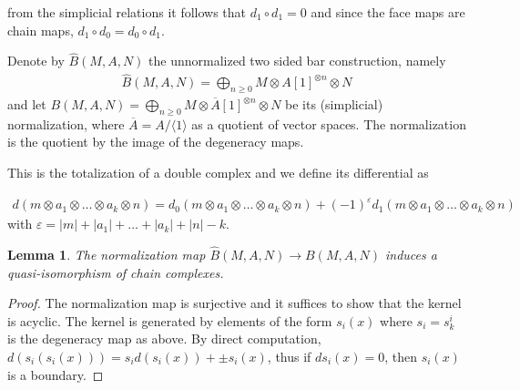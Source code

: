 \documentclass{scrartcl}
\theoremstyle{plain}
\newtheorem{lemma}[theorem]{Lemma}
\theoremstyle{definition}
\renewcommand{\epsilon}{\varepsilon}
\newcommand{\abs}[1]{\left\lvert#1\right\rvert}
\newcommand{\comp}{\mathbin{\circ}}
\begin{document}
 from the simplicial relations it follows that $d_1\comp d_1 = 0$ and since the face maps are chain maps, $d_1 \comp d_0 = d_0\comp d_1$. 

Denote by $\hat B(M, A, N)$ the unnormalized two sided bar construction, namely 
\begin{align*}
    \hat B(M, A, N) = \bigoplus_{n\geq 0} M\otimes A[1]^{\otimes n} \otimes N
\end{align*}
and let $B(M, A, N) = \bigoplus_{n\geq 0} M\otimes \overline {A}[1]^{\otimes n}\otimes N$ be its (simplicial) normalization, where $\overline A = A/\langle 1\rangle$ as a quotient of vector spaces. The normalization is the quotient by the image of the degeneracy maps. 

This is the totalization of a double complex and we define its differential as 

\begin{align*}
    d(m\otimes a_1\otimes \dots\otimes a_k\otimes n) = d_0(m\otimes a_1\otimes \dots\otimes a_k\otimes n) + (-1)^\epsilon d_1(m\otimes a_1\otimes \dots\otimes a_k\otimes n)
\end{align*}
with $\epsilon = \abs{m}+\abs{a_1}+\dots+\abs{a_{k}} + \abs{n} - k$.

\begin{lemma}
    The normalization map $\hat B(M, A, N)\to B(M, A, N)$ induces a quasi-isomorphism of chain complexes.
\end{lemma}
\begin{proof}
The normalization map is surjective and it suffices to show that the kernel is acyclic. The kernel is generated by elements of the form $s_i(x)$ where $s_i = s^i_k$ is the degeneracy map as above. By direct computation, $d(s_i(s_i(x))) = s_i d(s_i(x)) + \pm s_i(x)$, thus if $ds_i(x) = 0$, then $s_i(x)$ is a boundary.
\end{proof}
\end{document}
